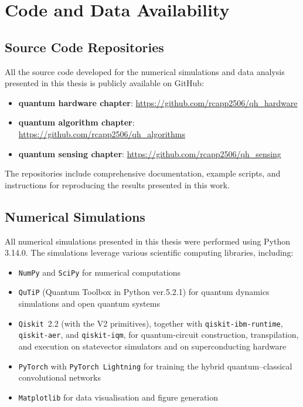 \chapter{Code and Data Availability}
\label{app:code_availability}

\section{Source Code Repositories}

All the source code developed for the numerical simulations and data analysis presented in this thesis is publicly available on GitHub:

\begin{itemize}
    \item \textbf{quantum hardware chapter}: \url{https://github.com/rcapp2506/qh_hardware}
    \item \textbf{quantum algorithm chapter}: \url{https://github.com/rcapp2506/qh_algorithms}
    \item \textbf{quantum sensing chapter}: \url{https://github.com/rcapp2506/qh_sensing}
\end{itemize}

The repositories include comprehensive documentation, example scripts, and instructions for reproducing the results presented in this work.

\section{Numerical Simulations}

All numerical simulations presented in this thesis were performed using Python 3.14.0. The simulations leverage various scientific computing libraries, including:

\begin{itemize}
    \item \texttt{NumPy} and \texttt{SciPy} for numerical computations
    \item \texttt{QuTiP}\cite{qutip5} (Quantum Toolbox in Python ver.5.2.1) for quantum dynamics simulations and open quantum systems
    \item \texttt{Qiskit}~2.2 (with the V2 primitives), together with \texttt{qiskit-ibm-runtime}, \texttt{qiskit-aer}, and \texttt{qiskit-iqm}, for quantum-circuit construction, transpilation, and execution on statevector simulators and on superconducting hardware
    \item \texttt{PyTorch} with \texttt{PyTorch Lightning} for training the hybrid quantum--classical convolutional networks
    \item \texttt{Matplotlib} for data visualisation and figure generation
\end{itemize}

